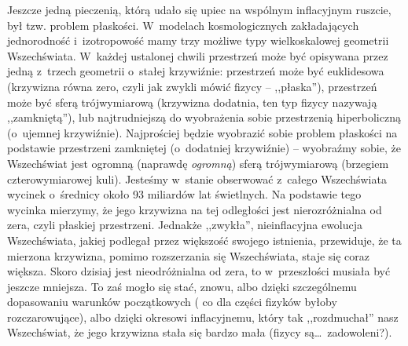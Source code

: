 \begin{dwieszpalty}
Jeszcze jedną pieczenią, którą udało się upiec na wspólnym inflacyjnym ruszcie, był tzw. problem płaskości. W~modelach kosmologicznych zakładających jednorodność i~izotropowość mamy trzy możliwe typy wielkoskalowej geometrii Wszechświata. W~każdej ustalonej chwili przestrzeń może być opisywana przez jedną z~trzech geometrii o~stałej krzywiźnie: przestrzeń może być euklidesowa (krzywizna równa zero, czyli jak zwykli mówić fizycy -- ,,płaska''), przestrzeń może być sferą trójwymiarową (krzywizna dodatnia, ten typ fizycy nazywają ,,zamkniętą''), lub najtrudniejszą do wyobrażenia sobie przestrzenią hiperboliczną  (o~ujemnej krzywiźnie).%
Najprościej będzie wyobrazić sobie problem płaskości na podstawie przestrzeni zamkniętej (o~dodatniej krzywiźnie) -- wyobraźmy sobie, że Wszechświat jest ogromną (naprawdę \textit{ogromną}) sferą trójwymiarową (brzegiem czterowymiarowej kuli). Jesteśmy w~stanie obserwować z~całego Wszechświata wycinek o~średnicy około 93 miliardów lat świetlnych. Na podstawie tego wycinka mierzymy, że jego krzywizna na tej odległości jest nierozróżnialna od zera, czyli płaskiej przestrzeni. Jednakże ,,zwykła'', nieinflacyjna ewolucja Wszechświata, jakiej podlegał przez większość swojego istnienia, przewiduje, że ta mierzona krzywizna, pomimo rozszerzania się Wszechświata, staje się coraz większa. Skoro dzisiaj jest nieodróżnialna od zera, to w~przeszłości musiała być jeszcze mniejsza. To zaś mogło się stać, znowu, albo dzięki szczególnemu dopasowaniu warunków początkowych (%
co dla części fizyków byłoby rozczarowujące), albo dzięki okresowi inflacyjnemu, który tak ,,rozdmuchał'' nasz Wszechświat, że jego krzywizna stała się bardzo mała (fizycy są\ldots\ zadowoleni?).


\end{dwieszpalty}
